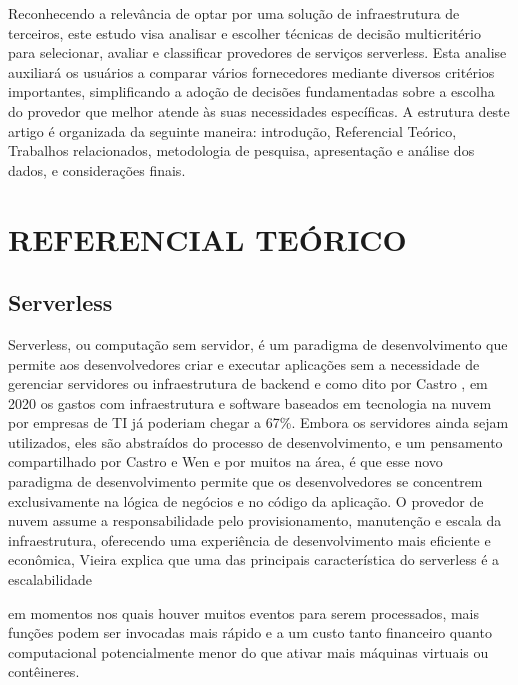 \documentclass[12pt]{article}[abntex2]
\begin{document}
Reconhecendo a relevância de optar por uma solução de infraestrutura de terceiros, este estudo visa analisar e escolher técnicas de decisão multicritério para selecionar, avaliar e classificar provedores de serviços serverless. Esta analise auxiliará os usuários a comparar vários fornecedores mediante diversos critérios importantes, simplificando a adoção de decisões fundamentadas sobre a escolha do provedor que melhor atende às suas necessidades específicas. A estrutura deste artigo é organizada da seguinte maneira: introdução, Referencial Teórico, Trabalhos relacionados, metodologia de pesquisa, apresentação e análise dos dados, e considerações finais.


\section{REFERENCIAL TEÓRICO}
\subsection{Serverless}
Serverless, ou computação sem servidor, é um paradigma de desenvolvimento que permite aos desenvolvedores criar e executar aplicações sem a necessidade de gerenciar servidores ou infraestrutura de backend e como dito por Castro \cite{castro2019}, em 2020 os gastos com infraestrutura e software baseados em tecnologia na nuvem por empresas de TI já poderiam chegar a 67\%. Embora os servidores ainda sejam utilizados, eles são abstraídos do processo de desenvolvimento, e um pensamento compartilhado por Castro \cite{castro2019} e Wen \cite{wen2023rise} e por muitos na área, é que esse novo paradigma de desenvolvimento permite que os desenvolvedores se concentrem exclusivamente na lógica de negócios e no código da aplicação. O provedor de nuvem assume a responsabilidade pelo provisionamento, manutenção e escala da infraestrutura, oferecendo uma experiência de desenvolvimento mais eficiente e econômica, Vieira \cite{gomes_computacao_2020} explica que uma das principais característica do serverless é a escalabilidade\\

\begin{flushright}
\begin{minipage}{10cm}
\fontsize{11}{12}\selectfont
em momentos nos quais houver muitos eventos para serem processados, mais funções podem ser invocadas mais rápido e a um custo tanto financeiro quanto computacional potencialmente menor do que ativar mais máquinas virtuais ou contêineres.
\end{minipage}
\end{flushright}
\end{document}
